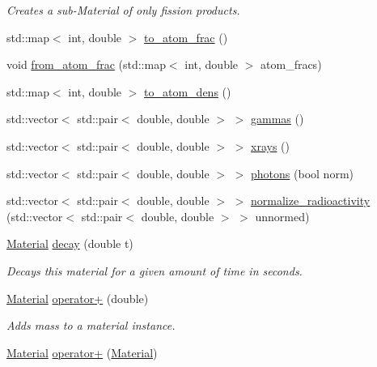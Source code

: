 \begin{DoxyCompactItemize}
\begin{DoxyCompactList}\small\item\em Creates a sub-\/\+Material of only fission products. \end{DoxyCompactList}\item 
std\+::map$<$ int, double $>$ \hyperlink{classpyne_1_1_material_a89a5ef5a4bfca961981a46a4252299fd}{to\+\_\+atom\+\_\+frac} ()
\item 
void \hyperlink{classpyne_1_1_material_a2db9572599c20eb0d17bd0993766f792}{from\+\_\+atom\+\_\+frac} (std\+::map$<$ int, double $>$ atom\+\_\+fracs)
\item 
std\+::map$<$ int, double $>$ \hyperlink{classpyne_1_1_material_adfc05d7c09a0908047a9b733aa7c78b1}{to\+\_\+atom\+\_\+dens} ()
\item 
std\+::vector$<$ std\+::pair$<$ double, double $>$ $>$ \hyperlink{classpyne_1_1_material_a2e2721b8ec8fde2d2e08379b39220d00}{gammas} ()
\item 
std\+::vector$<$ std\+::pair$<$ double, double $>$ $>$ \hyperlink{classpyne_1_1_material_a24fbf883f1623dccc4053106041510d5}{xrays} ()
\item 
std\+::vector$<$ std\+::pair$<$ double, double $>$ $>$ \hyperlink{classpyne_1_1_material_a3630f6f54a7ff6355da0b76b4d0e35a1}{photons} (bool norm)
\item 
std\+::vector$<$ std\+::pair$<$ double, double $>$ $>$ \hyperlink{classpyne_1_1_material_a114deb10e8d118bbd37ade0fbce5253d}{normalize\+\_\+radioactivity} (std\+::vector$<$ std\+::pair$<$ double, double $>$ $>$ unnormed)
\item 
\hyperlink{classpyne_1_1_material}{Material} \hyperlink{classpyne_1_1_material_a1b9decf23001574896c3413265677307}{decay} (double t)\hypertarget{classpyne_1_1_material_a1b9decf23001574896c3413265677307}{}\label{classpyne_1_1_material_a1b9decf23001574896c3413265677307}

\begin{DoxyCompactList}\small\item\em Decays this material for a given amount of time in seconds. \end{DoxyCompactList}\item 
\hyperlink{classpyne_1_1_material}{Material} \hyperlink{classpyne_1_1_material_a97bae8b18322f26e1cd87d8909ce42b6}{operator+} (double)\hypertarget{classpyne_1_1_material_a97bae8b18322f26e1cd87d8909ce42b6}{}\label{classpyne_1_1_material_a97bae8b18322f26e1cd87d8909ce42b6}

\begin{DoxyCompactList}\small\item\em Adds mass to a material instance. \end{DoxyCompactList}\item 
\hyperlink{classpyne_1_1_material}{Material} \hyperlink{classpyne_1_1_material_a1913e1a1b525352bf4f0b4155b6d39b7}{operator+} (\hyperlink{classpyne_1_1_material}{Material})\hypertarget{classpyne_1_1_material_a1913e1a1b525352bf4f0b4155b6d39b7}{}\label{classpyne_1_1_material_a1913e1a1b525352bf4f0b4155b6d39b7}


\end{DoxyCompactItemize}

